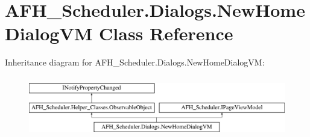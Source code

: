 \section{A\+F\+H\+\_\+\+Scheduler.\+Dialogs.\+New\+Home\+Dialog\+VM Class Reference}
\label{class_a_f_h___scheduler_1_1_dialogs_1_1_new_home_dialog_v_m}
Inheritance diagram for A\+F\+H\+\_\+\+Scheduler.\+Dialogs.\+New\+Home\+Dialog\+VM\+:\begin{figure}[H]
\begin{center}
\leavevmode
\includegraphics[height=2.700965cm]{class_a_f_h___scheduler_1_1_dialogs_1_1_new_home_dialog_v_m}
\end{center}
\end{figure}
